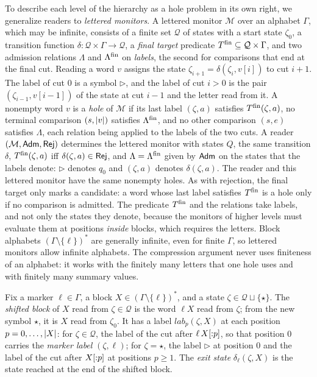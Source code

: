 To describe each level of the hierarchy as a hole problem in its own right, we generalize
readers to \emph{lettered monitors}. A lettered monitor $\mathcal{M}$ over an alphabet
$\Gamma$, which may be infinite, consists of a finite set $\mathcal Q$ of states with a start state $\zeta_0$, a transition
function $\delta : \mathcal Q \times \Gamma \to \mathcal Q$, a \emph{final target} predicate
$T^{\mathrm{fin}} \subseteq \mathcal Q \times \Gamma$, and two admission relations $\Lambda$ and $\Lambda^{\mathrm{fin}}$ on
\emph{labels}, the second for comparisons that end at the final cut. Reading a word $v$
assigns the state $\zeta_{i+1} = \delta(\zeta_i, v[i])$ to cut $i+1$. The label of cut $0$ is a
symbol $\triangleright$, and the label of cut $i > 0$ is the pair $(\zeta_{i-1}, v[i-1])$ of the
state at cut $i-1$ and the letter read from it. A nonempty word $v$ is a \emph{hole} of
$\mathcal{M}$ if its last label $(\zeta,a)$ satisfies $T^{\mathrm{fin}}(\zeta,a)$, no terminal comparison
$(s,\lvert v\rvert)$ satisfies $\Lambda^{\mathrm{fin}}$, and no other comparison $(s,e)$ satisfies $\Lambda$, each
relation being applied to the labels of the two cuts. A reader $(\mathcal{M},\mathsf{Adm},\mathsf{Rej})$ determines the
lettered monitor with states $Q$, the same transition $\delta$, $T^{\mathrm{fin}}(\zeta,a)$ iff $\delta(\zeta,a) \in \mathsf{Rej}$,
and $\Lambda = \Lambda^{\mathrm{fin}}$ given by $\mathsf{Adm}$ on the states that the labels denote: $\triangleright$
denotes $q_0$ and $(\zeta,a)$ denotes $\delta(\zeta,a)$. The reader and this lettered monitor have the same nonempty holes.
As with rejection, the final target only marks a candidate: a word whose last label
satisfies $T^{\mathrm{fin}}$ is a hole only if no comparison is admitted.
The predicate $T^{\mathrm{fin}}$ and the relations take labels, and not only the states
they denote, because the monitors of higher levels must evaluate them at positions
\emph{inside} blocks, which requires the letters. Block alphabets $(\Gamma\setminus\{\ell\})^*$
are generally infinite, even for finite $\Gamma$, so lettered monitors allow infinite
alphabets. The compression argument never uses finiteness of an alphabet: it works with
the finitely many letters that one hole uses and with finitely many summary values.

Fix a marker $\ell \in \Gamma$, a block $X \in (\Gamma \setminus \{\ell\})^*$, and a state
$\zeta \in \mathcal Q \sqcup \{\star\}$. The \emph{shifted block} of $X$ read from $\zeta \in \mathcal Q$ is the word
$\ell X$ read from $\zeta$; from the new symbol $\star$, it is $X$ read from $\zeta_0$. It has a label
$\mathit{lab}_p(\zeta,X)$ at each position $p = 0, \dots, \lvert X\rvert$: for $\zeta \in \mathcal Q$, the label of the
cut after $\ell\,X[{:}p]$, so that position $0$ carries the \emph{marker label}
$(\zeta,\ell)$; for $\zeta = \star$, the label $\triangleright$ at position $0$ and the label of the cut
after $X[{:}p]$ at positions $p \ge 1$. The \emph{exit state} $\delta_\ell(\zeta,X)$ is the
state reached at the end of the shifted block.

